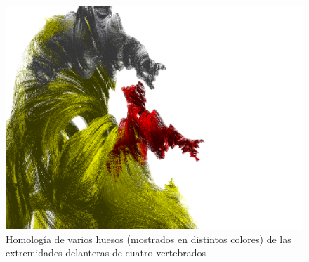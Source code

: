 \documentclass[
  11pt,
]{krantz}
\theoremstyle{definition}
\theoremstyle{definition}
\theoremstyle{definition}
\theoremstyle{definition}
\theoremstyle{remark}
\begin{document}
\begin{figure}[!ht]

{\centering \includegraphics[width=1\linewidth]{povray} 

}

\caption{Homología de varios huesos (mostrados en distintos colores) de las extremidades delanteras de cuatro vertebrados}\label{fig:ray}
\end{figure}
\end{document}
